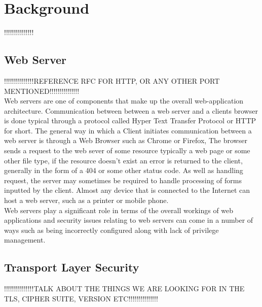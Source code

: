 \documentclass[a4wide,leqno,12pt]{report}
\begin{document}
\chapter{Background}
!!!!!!!!!!!!!!! 
\section{Web Server}
!!!!!!!!!!!!!!!REFERENCE RFC FOR HTTP, OR ANY OTHER PORT MENTIONED!!!!!!!!!!!!!!!\\




Web servers are one of components that make up the overall web-application architecture. 
Communication between between a web server and a clients browser is done typical through a protocol called Hyper Text Transfer Protocol or HTTP for short. The general way in which a Client initiates communication between a web server is through a Web Browser such as Chrome or Firefox, The browser sends a request to the web sever of some resource typically a web page or some other file type, if the resource doesn't exist an error is returned to the client, generally in the form of a 404 or some other status code. As well as handling request, the server may sometimes be required to handle processing of forms inputted by the client\cite{conallen1999modeling}. Almost any device that is connected to the Internet can host a web server, such as a printer or mobile phone. \\

Web servers play a significant role in terms of the overall workings of web applications and security issues relating to web servers can come in a number of ways such as being incorrectly configured\cite{mendes2008assessing} along with lack of privilege management.
\section{Transport Layer Security}
!!!!!!!!!!!!!!!TALK ABOUT THE THINGS WE ARE LOOKING FOR IN THE TLS, CIPHER SUITE, VERSION ETC!!!!!!!!!!!!!!!\\
\end{document}
